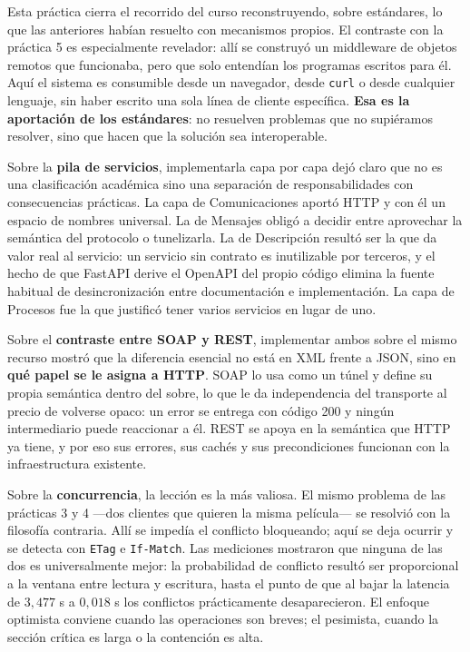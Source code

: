 \documentclass[12pt]{article}
\begin{document}
Esta práctica cierra el recorrido del curso reconstruyendo, sobre estándares, lo que las anteriores habían resuelto con mecanismos propios. El contraste con la práctica 5 es especialmente revelador: allí se construyó un middleware de objetos remotos que funcionaba, pero que solo entendían los programas escritos para él. Aquí el sistema es consumible desde un navegador, desde \texttt{curl} o desde cualquier lenguaje, sin haber escrito una sola línea de cliente específica. \textbf{Esa es la aportación de los estándares}: no resuelven problemas que no supiéramos resolver, sino que hacen que la solución sea interoperable.

Sobre la \textbf{pila de servicios}, implementarla capa por capa dejó claro que no es una clasificación académica sino una separación de responsabilidades con consecuencias prácticas. La capa de Comunicaciones aportó HTTP y con él un espacio de nombres universal. La de Mensajes obligó a decidir entre aprovechar la semántica del protocolo o tunelizarla. La de Descripción resultó ser la que da valor real al servicio: un servicio sin contrato es inutilizable por terceros, y el hecho de que FastAPI derive el OpenAPI del propio código elimina la fuente habitual de desincronización entre documentación e implementación. La capa de Procesos fue la que justificó tener varios servicios en lugar de uno.

Sobre el \textbf{contraste entre SOAP y REST}, implementar ambos sobre el mismo recurso mostró que la diferencia esencial no está en XML frente a JSON, sino en \textbf{qué papel se le asigna a HTTP}. SOAP lo usa como un túnel y define su propia semántica dentro del sobre, lo que le da independencia del transporte al precio de volverse opaco: un error se entrega con código 200 y ningún intermediario puede reaccionar a él. REST se apoya en la semántica que HTTP ya tiene, y por eso sus errores, sus cachés y sus precondiciones funcionan con la infraestructura existente.

Sobre la \textbf{concurrencia}, la lección es la más valiosa. El mismo problema de las prácticas 3 y 4 —dos clientes que quieren la misma película— se resolvió con la filosofía contraria. Allí se impedía el conflicto bloqueando; aquí se deja ocurrir y se detecta con \texttt{ETag} e \texttt{If-Match}. Las mediciones mostraron que ninguna de las dos es universalmente mejor: la probabilidad de conflicto resultó ser proporcional a la ventana entre lectura y escritura, hasta el punto de que al bajar la latencia de $3{,}477$ s a $0{,}018$ s los conflictos prácticamente desaparecieron. El enfoque optimista conviene cuando las operaciones son breves; el pesimista, cuando la sección crítica es larga o la contención es alta.
\end{document}
